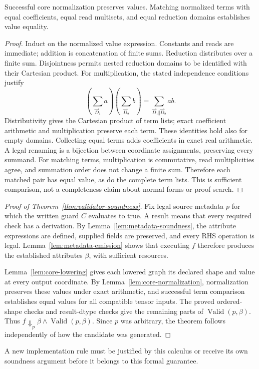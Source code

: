 \begin{lemma}
\label{lem:core-normalization}
Successful core normalization preserves values. Matching normalized terms
with equal coefficients, equal read multisets, and equal reduction domains
establishes value equality.
\end{lemma}
\begin{proof}
Induct on the normalized value expression. Constants and reads are immediate;
addition is concatenation of finite sums. Reduction distributes over a
finite sum. Disjointness permits nested reduction domains to be identified
with their Cartesian product. For multiplication, the stated independence
conditions justify
\begin{equation}
 \left(\sum_{\vec D_1}a\right)\left(\sum_{\vec D_2}b\right)
 =\sum_{\vec D_1\Vert \vec D_2}ab.
\end{equation}
Distributivity gives the Cartesian product of term lists; exact coefficient
arithmetic and multiplication preserve each term. These identities hold
also for empty domains. Collecting equal terms adds coefficients in exact
real arithmetic. A legal renaming is a bijection between coordinate
assignments, preserving every summand. For matching terms, multiplication
is commutative, read multiplicities agree, and summation order does not
change a finite sum. Therefore each matched pair has equal value, as do
the complete term lists. This is sufficient comparison, not a completeness
claim about normal forms or proof search.
\end{proof}

\begin{proof}[Proof of Theorem~\ref{thm:validator-soundness}]
Fix legal source metadata $p$ for which the written guard $C$ evaluates to
true. A  result means that every required check has a
derivation. By Lemma~\ref{lem:metadata-soundness}, the attribute expressions
are defined, supplied fields are preserved, and every RHS operation is
legal. Lemma~\ref{lem:metadata-emission} shows that executing $f$ therefore
produces the established attributes $\beta$, with sufficient resources.

Lemma~\ref{lem:core-lowering} gives each lowered graph its declared shape
and value at every output coordinate. By
Lemma~\ref{lem:core-normalization}, normalization preserves these values
under exact arithmetic, and successful term comparison establishes equal
values for all compatible tensor inputs. The proved ordered-shape checks
and result-dtype checks give the remaining parts of
$\operatorname{Valid}(p,\beta)$. Thus
$f\Downarrow_p\beta\land\operatorname{Valid}(p,\beta)$.
Since $p$ was arbitrary, the theorem follows independently of how the
candidate was generated.
\end{proof}
A new implementation rule must be justified by this calculus or receive
its own soundness argument before it belongs to this formal guarantee.

